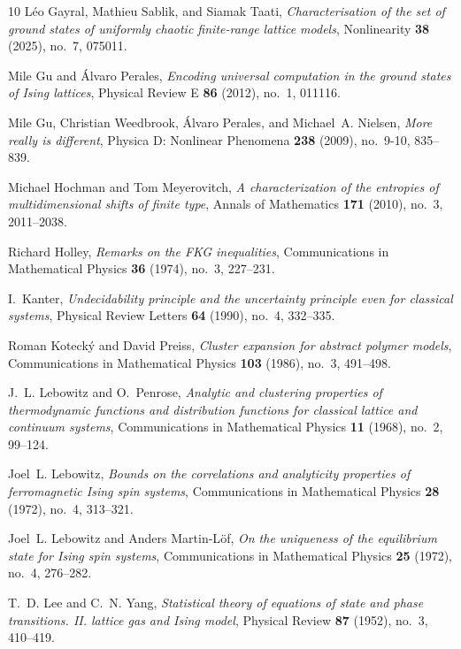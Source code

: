 \documentclass[11pt,reqno]{amsart}
\numberwithin{equation}{section}
\theoremstyle{definition}
\theoremstyle{remark}
\begin{document}
\begin{thebibliography}{10}
L{\'e}o Gayral, Mathieu Sablik, and Siamak Taati, \emph{Characterisation of the
  set of ground states of uniformly chaotic finite-range lattice models},
  Nonlinearity \textbf{38} (2025), no.~7, 075011.

Mile Gu and {\'A}lvaro Perales, \emph{Encoding universal computation in the
  ground states of {Ising} lattices}, Physical Review E \textbf{86} (2012),
  no.~1, 011116.

Mile Gu, Christian Weedbrook, {\'A}lvaro Perales, and Michael~A. Nielsen,
  \emph{More really is different}, Physica D: Nonlinear Phenomena \textbf{238}
  (2009), no.~9-10, 835--839.

Michael Hochman and Tom Meyerovitch, \emph{A characterization of the entropies
  of multidimensional shifts of finite type}, Annals of Mathematics
  \textbf{171} (2010), no.~3, 2011--2038.

Richard Holley, \emph{Remarks on the {FKG} inequalities}, Communications in
  Mathematical Physics \textbf{36} (1974), no.~3, 227--231.

I.~Kanter, \emph{Undecidability principle and the uncertainty principle even
  for classical systems}, Physical Review Letters \textbf{64} (1990), no.~4,
  332--335.

Roman Koteck{\'y} and David Preiss, \emph{Cluster expansion for abstract
  polymer models}, Communications in Mathematical Physics \textbf{103} (1986),
  no.~3, 491--498.

J.~L. Lebowitz and O.~Penrose, \emph{Analytic and clustering properties of
  thermodynamic functions and distribution functions for classical lattice and
  continuum systems}, Communications in Mathematical Physics \textbf{11}
  (1968), no.~2, 99--124.

Joel~L. Lebowitz, \emph{Bounds on the correlations and analyticity properties
  of ferromagnetic {Ising} spin systems}, Communications in Mathematical
  Physics \textbf{28} (1972), no.~4, 313--321.

Joel~L. Lebowitz and Anders Martin-L{\"o}f, \emph{On the uniqueness of the
  equilibrium state for {Ising} spin systems}, Communications in Mathematical
  Physics \textbf{25} (1972), no.~4, 276--282.

T.~D. Lee and C.~N. Yang, \emph{Statistical theory of equations of state and
  phase transitions. {II}. lattice gas and {Ising} model}, Physical Review
  \textbf{87} (1952), no.~3, 410--419.


\end{thebibliography}
\end{document}
